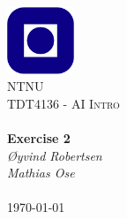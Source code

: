\begin{titlepage}
\begin{center}
\includegraphics[width=0.15\textwidth]{img/NTNU.png}~\\[1cm]

\textsc{\LARGE NTNU}\\[1.5cm]

\textsc{\Large TDT4136 - AI Intro}\\[0.5cm]

\HRule \\[0.4cm]
{ \huge \bfseries Exercise 2}\\[0.5cm]
{\large \textit{Øyvind Robertsen\\Mathias Ose}}\\[0.2cm]
\HRule \\[1.5cm]



\vfill
{\large \today}
\end{center}
\end{titlepage}

